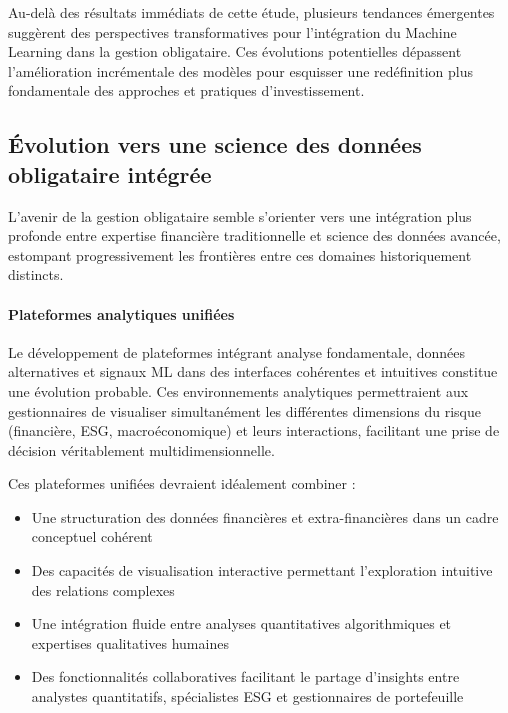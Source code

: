 Au-delà des résultats immédiats de cette étude, plusieurs tendances émergentes suggèrent des perspectives transformatives pour l'intégration du Machine Learning dans la gestion obligataire. Ces évolutions potentielles dépassent l'amélioration incrémentale des modèles pour esquisser une redéfinition plus fondamentale des approches et pratiques d'investissement.

\subsection*{Évolution vers une science des données obligataire intégrée}

L'avenir de la gestion obligataire semble s'orienter vers une intégration plus profonde entre expertise financière traditionnelle et science des données avancée, estompant progressivement les frontières entre ces domaines historiquement distincts.

\paragraph{Plateformes analytiques unifiées} 
Le développement de plateformes intégrant analyse fondamentale, données alternatives et signaux ML dans des interfaces cohérentes et intuitives constitue une évolution probable. Ces environnements analytiques permettraient aux gestionnaires de visualiser simultanément les différentes dimensions du risque (financière, ESG, macroéconomique) et leurs interactions, facilitant une prise de décision véritablement multidimensionnelle.

Ces plateformes unifiées devraient idéalement combiner :
\begin{itemize}
    \item Une structuration des données financières et extra-financières dans un cadre conceptuel cohérent
    \item Des capacités de visualisation interactive permettant l'exploration intuitive des relations complexes
    \item Une intégration fluide entre analyses quantitatives algorithmiques et expertises qualitatives humaines
    \item Des fonctionnalités collaboratives facilitant le partage d'insights entre analystes quantitatifs, spécialistes ESG et gestionnaires de portefeuille
\end{itemize}


